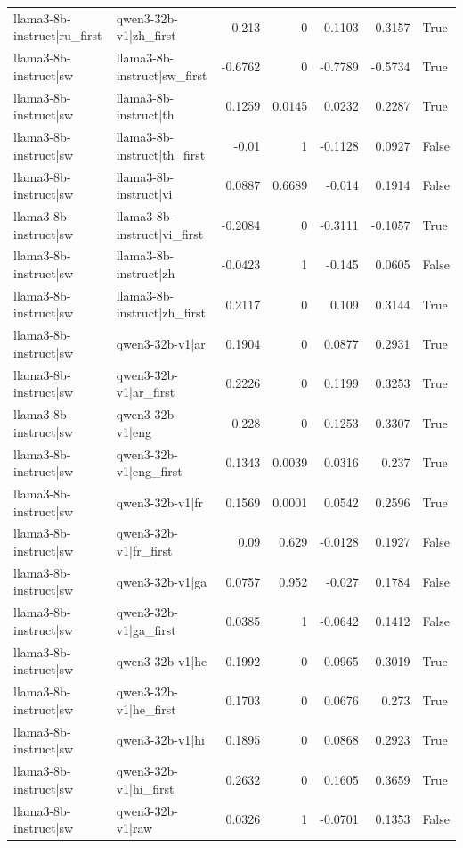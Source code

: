 \begin{table}
\begin{tabular}{l l r r r r l}
llama3-8b-instruct|ru_first & qwen3-32b-v1|zh_first & 0.213 & 0 & 0.1103 & 0.3157 & True \\
llama3-8b-instruct|sw & llama3-8b-instruct|sw_first & -0.6762 & 0 & -0.7789 & -0.5734 & True \\
llama3-8b-instruct|sw & llama3-8b-instruct|th & 0.1259 & 0.0145 & 0.0232 & 0.2287 & True \\
llama3-8b-instruct|sw & llama3-8b-instruct|th_first & -0.01 & 1 & -0.1128 & 0.0927 & False \\
llama3-8b-instruct|sw & llama3-8b-instruct|vi & 0.0887 & 0.6689 & -0.014 & 0.1914 & False \\
llama3-8b-instruct|sw & llama3-8b-instruct|vi_first & -0.2084 & 0 & -0.3111 & -0.1057 & True \\
llama3-8b-instruct|sw & llama3-8b-instruct|zh & -0.0423 & 1 & -0.145 & 0.0605 & False \\
llama3-8b-instruct|sw & llama3-8b-instruct|zh_first & 0.2117 & 0 & 0.109 & 0.3144 & True \\
llama3-8b-instruct|sw & qwen3-32b-v1|ar & 0.1904 & 0 & 0.0877 & 0.2931 & True \\
llama3-8b-instruct|sw & qwen3-32b-v1|ar_first & 0.2226 & 0 & 0.1199 & 0.3253 & True \\
llama3-8b-instruct|sw & qwen3-32b-v1|eng & 0.228 & 0 & 0.1253 & 0.3307 & True \\
llama3-8b-instruct|sw & qwen3-32b-v1|eng_first & 0.1343 & 0.0039 & 0.0316 & 0.237 & True \\
llama3-8b-instruct|sw & qwen3-32b-v1|fr & 0.1569 & 0.0001 & 0.0542 & 0.2596 & True \\
llama3-8b-instruct|sw & qwen3-32b-v1|fr_first & 0.09 & 0.629 & -0.0128 & 0.1927 & False \\
llama3-8b-instruct|sw & qwen3-32b-v1|ga & 0.0757 & 0.952 & -0.027 & 0.1784 & False \\
llama3-8b-instruct|sw & qwen3-32b-v1|ga_first & 0.0385 & 1 & -0.0642 & 0.1412 & False \\
llama3-8b-instruct|sw & qwen3-32b-v1|he & 0.1992 & 0 & 0.0965 & 0.3019 & True \\
llama3-8b-instruct|sw & qwen3-32b-v1|he_first & 0.1703 & 0 & 0.0676 & 0.273 & True \\
llama3-8b-instruct|sw & qwen3-32b-v1|hi & 0.1895 & 0 & 0.0868 & 0.2923 & True \\
llama3-8b-instruct|sw & qwen3-32b-v1|hi_first & 0.2632 & 0 & 0.1605 & 0.3659 & True \\
llama3-8b-instruct|sw & qwen3-32b-v1|raw & 0.0326 & 1 & -0.0701 & 0.1353 & False \\

\end{tabular}
\end{table}
